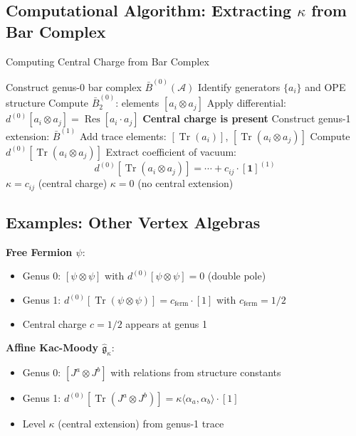\subsection{Computational Algorithm: Extracting $\kappa$ from Bar Complex}

\begin{algorithm}
\caption{Computing Central Charge from Bar Complex}
\begin{algorithmic}[1]
\State Construct genus-0 bar complex $\bar{B}^{(0)}(\mathcal{A})$
\State Identify generators $\{a_i\}$ and OPE structure
\State Compute $\bar{B}^{(0)}_2$: elements $[a_i \otimes a_j]$
\State Apply differential: $d^{(0)}[a_i \otimes a_j] = \operatorname{Res}[a_i \cdot a_j]$
    \State \textbf{Central charge is present}
    \State Construct genus-1 extension: $\bar{B}^{(1)}$
    \State Add trace elements: $[\operatorname{Tr}(a_i)]$, $[\operatorname{Tr}(a_i \otimes a_j)]$
    \State Compute $d^{(0)}[\operatorname{Tr}(a_i \otimes a_j)]$
    \State Extract coefficient of vacuum: 
    \[d^{(0)}[\operatorname{Tr}(a_i \otimes a_j)] = \cdots + c_{ij} \cdot [\mathbf{1}]^{(1)}\]
    \State \Return $\kappa = c_{ij}$ (central charge)
\Else
    \State \Return $\kappa = 0$ (no central extension)
\EndIf
\EndProcedure
\end{algorithmic}
\end{algorithm}

\subsection{Examples: Other Vertex Algebras}

\textbf{Free Fermion $\psi$}:
\begin{itemize}
\item Genus 0: $[\psi \otimes \psi]$ with $d^{(0)}[\psi \otimes \psi] = 0$ (double pole)
\item Genus 1: $d^{(0)}[\operatorname{Tr}(\psi \otimes \psi)] = c_{\text{ferm}} \cdot [1]$ with $c_{\text{ferm}} = 1/2$
\item Central charge $c = 1/2$ appears at genus 1
\end{itemize}

\textbf{Affine Kac-Moody $\hat{\mathfrak{g}}_\kappa$}:
\begin{itemize}
\item Genus 0: $[J^a \otimes J^b]$ with relations from structure constants
\item Genus 1: $d^{(0)}[\operatorname{Tr}(J^a \otimes J^b)] = \kappa \langle \alpha_a, \alpha_b \rangle \cdot [1]$
\item Level $\kappa$ (central extension) from genus-1 trace
\end{itemize}

